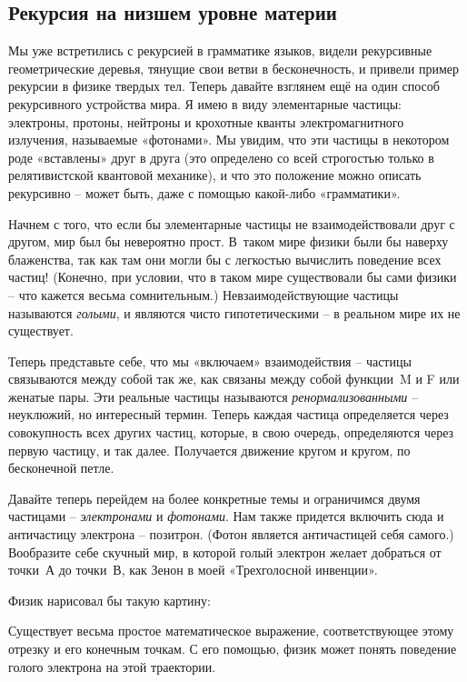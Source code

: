 \documentclass[../main.tex]{subfiles}
\begin{document}
\subsection{Рекурсия на низшем уровне материи}

Мы уже встретились с рекурсией в грамматике языков, видели рекурсивные геометрические деревья, тянущие свои ветви в бесконечность, и привели пример рекурсии в физике твердых тел. Теперь давайте взглянем ещё на один способ рекурсивного устройства мира. Я имею в виду элементарные частицы: электроны, протоны, нейтроны и крохотные кванты электромагнитного излучения, называемые «фотонами». Мы увидим, что эти частицы в некотором роде «вставлены» друг в друга (это определено со всей строгостью только в релятивистской квантовой механике), и что это положение можно описать рекурсивно \--- может быть, даже с помощью какой-либо «грамматики».

Начнем с того, что если бы элементарные частицы не взаимодействовали друг с другом, мир был бы невероятно прост. В~таком мире физики были бы наверху блаженства, так как там они могли бы с легкостью вычислить поведение всех частиц! (Конечно, при условии, что в таком мире существовали бы сами физики \--- что кажется весьма сомнительным.) Невзаимодействующие частицы называются \emph{голыми}, и являются чисто гипотетическими \--- в реальном мире их не существует.

Теперь представьте себе, что мы «включаем» взаимодействия \--- частицы связываются между собой так же, как связаны между собой функции~M и F или женатые пары. Эти реальные частицы называются \emph{ренормализованными} \--- неуклюжий, но интересный термин. Теперь каждая частица определяется через совокупность всех других частиц, которые, в свою очередь, определяются через первую частицу, и так далее. Получается движение кругом и кругом, по бесконечной петле.

Давайте теперь перейдем на более конкретные темы и ограничимся двумя частицами \--- \emph{электронами} и \emph{фотонами}. Нам также придется включить сюда и античастицу электрона \--- позитрон. (Фотон является античастицей себя самого.) Вообразите себе скучный мир, в которой голый электрон желает добраться от точки~А до точки~В, как Зенон в моей «Трехголосной инвенции».

Физик нарисовал бы такую картину:

Существует весьма простое математическое выражение, соответствующее этому отрезку и его конечным точкам. С его помощью, физик может понять поведение голого электрона на этой траектории.
\end{document}
